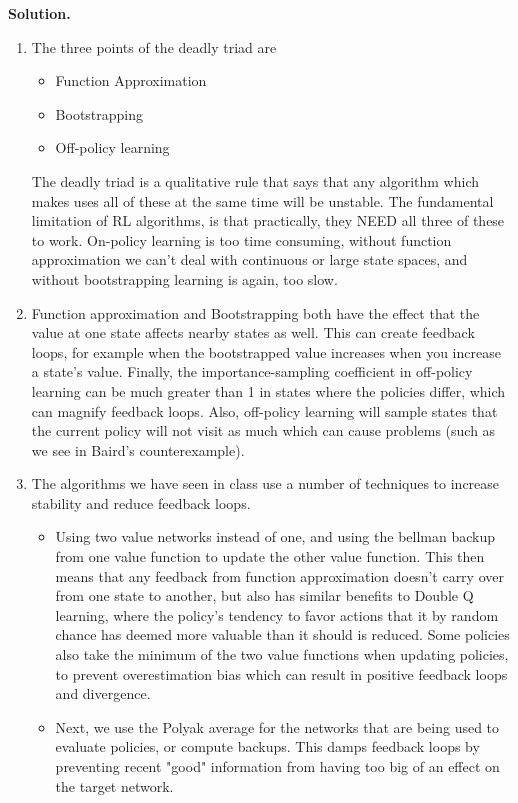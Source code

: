 \documentclass[11pt]{article}
\begin{document}
\textbf{Solution.}
\begin{enumerate}
    \item[(a)] The three points of the deadly triad are
        \begin{itemize}
            \item Function Approximation
            \item Bootstrapping
            \item Off-policy learning
        \end{itemize}
        The deadly triad is a qualitative rule that says that any algorithm which makes uses all of these at the same time will be unstable.
        The fundamental limitation of RL algorithms, is that practically, they NEED all three of these to work.
        On-policy learning is too time consuming, without function approximation we can't deal with continuous or large state spaces, and without bootstrapping learning is again, too slow.
    \item[(b)] Function approximation and Bootstrapping both have the effect that the value at one state affects nearby states as well.
        This can create feedback loops, for example when the bootstrapped value increases when you increase a state's value.
        Finally, the importance-sampling coefficient in off-policy learning can be much greater than 1 in states where the policies differ, which can magnify feedback loops.
        Also, off-policy learning will sample states that the current policy will not visit as much which can cause problems (such as we see in Baird's counterexample).
    \item[(c)] The algorithms we have seen in class use a number of techniques to increase stability and reduce feedback loops.
        \begin{itemize}
            \item Using two value networks instead of one, and using the bellman backup from one value function to update the other value function. This then means that any feedback from function approximation doesn't carry over from one state to another, but also has similar benefits to Double Q learning, where the policy's tendency to favor actions that it by random chance has deemed more valuable than it should is reduced. Some policies also take the minimum of the two value functions when updating policies, to prevent overestimation bias which can result in positive feedback loops and divergence.
            \item Next, we use the Polyak average for the networks that are being used to evaluate policies, or compute backups. This damps feedback loops by preventing recent "good" information from having too big of an effect on the target network.

\end{itemize}
\end{enumerate}
\end{document}
